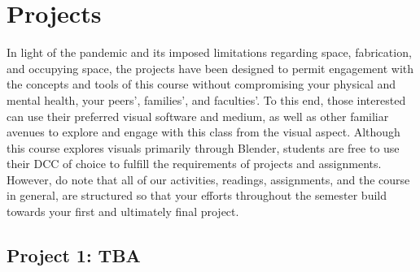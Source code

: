 \section{Projects}

In light of the pandemic and its imposed limitations regarding space, fabrication, and occupying space, the projects have been designed to permit engagement with the concepts and tools of this course without compromising your physical and mental health, your peers', families', and faculties'. To this end, those interested can use their preferred visual software and medium, as well as other familiar avenues to explore and engage with this class from the visual aspect. Although this course explores visuals primarily through Blender, students are free to use their DCC of choice to fulfill the requirements of projects and assignments. However, do note that all of our activities, readings, assignments, and the course in general, are structured so that your efforts throughout the semester build towards your first and ultimately final project.

\hypertarget{project2}{\subsection{Project 1: TBA}}


